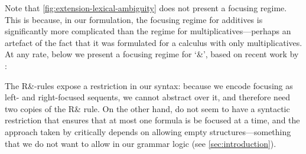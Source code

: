 Note that \autoref{fig:extension-lexical-ambiguity} does not present a
focusing regime. This is because, in our formulation, the focusing
regime for additives is significantly more complicated than the regime
for multiplicatives---perhaps an artefact of the fact that it was
formulated for a calculus with only multiplicatives. At any rate,
below we present a focusing regime for `\&', based on recent work by
\citet{morrill2015}:
\\
\begin{center}
  \begin{pfbox}
  \end{pfbox}
  \begin{pfbox}
  \end{pfbox}
\end{center}
The R\&-rules expose a restriction in our syntax: because we
encode focusing as left- and right-focused sequents, we cannot
abstract over it, and therefore need two copies of the R\& rule.
On the other hand, \citet{morrill2015} do not seem to have a syntactic
restriction that ensures that at most one formula is be focused at a
time, and the approach taken by \citet{laurent2004} critically depends
on allowing empty structures---something that we do not want to allow
in our grammar logic (see \autoref{sec:introduction}).

